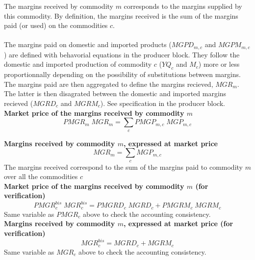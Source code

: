\documentclass[12pt]{article}
\numberwithin{equation}{section}
\begin{document}
The margins received by commodity $m$ corresponds to the margins supplied by this commodity. By definition, the margins received is the sum of the margins paid (or used) on the commodities $c$. \\ \\
The margins paid on domestic and imported products ($MGPD_{m, c}$ and $MGPM_{m, c}$) are defined with behavorial equations in the producer block. They follow the domestic and imported production of commodity $c$ ($YQ_{c}$ and $M_{c}$) more or less proportionnally depending on the possibility of substitutions between margins. The margins paid are then aggregated to define the margins recieved, $MGR_{m}$. The latter is then disagrated between the domestic and imported margins recieved ($MGRD_{c}$ and $MGRM_{c}$). See specification in the producer block. \\

\noindent\textbf{Market price of the margins received by commodity $m$} \\
\begin{dmath}
PMGR_{m} \; MGR_{m} = \sum_{c} PMGP_{m, c} \; MGP_{m, c}
\end{dmath}

\noindent\textbf{Margins received by commodity $m$, expressed at market price} \\
\begin{dmath}
MGR_{m} = \sum_{c} MGP_{m, c}
\end{dmath}
The margins received correspond to the sum of the margins paid to commodity $m$ over all the commodities $c$ \\

\noindent\textbf{Market price of the margins received by commodity $m$ (for verification)} \\
\begin{dmath}
PMGR^{bis}_{c} \; MGR^{bis}_{c} = PMGRD_{c} \; MGRD_{c} + PMGRM_{c} \; MGRM_{c}
\end{dmath}
Same variable as $PMGR_{c}$ above to check the accounting consistency. \\

\noindent\textbf{Margins received by commodity $m$, expressed at market price (for verification)} \\
\begin{dmath}
MGR^{bis}_{c} = MGRD_{c} + MGRM_{c}
\end{dmath}
Same variable as $MGR_{c}$ above to check the accounting consistency. \\
\end{document}
